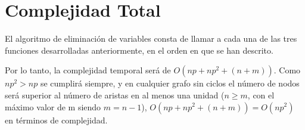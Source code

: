 \documentclass[a4paper,12pt]{article}
\begin{document}
\section{Complejidad Total}
El algoritmo de eliminación de variables consta de llamar a cada una de las tres funciones desarrolladas anteriormente, en el orden en que se han descrito.

Por lo tanto, la complejidad temporal será de $O(np+np^2+(n+m))$. Como $np^2 > np$ se cumplirá siempre, y en cualquier grafo sin ciclos el número de nodos será superior al número de aristas en al menos una unidad ($n \ge m$, con el máximo valor de m siendo $m = n - 1$), $O(np+np^2+(n+m)) = O(np^2)$ en términos de complejidad.
\end{document}
